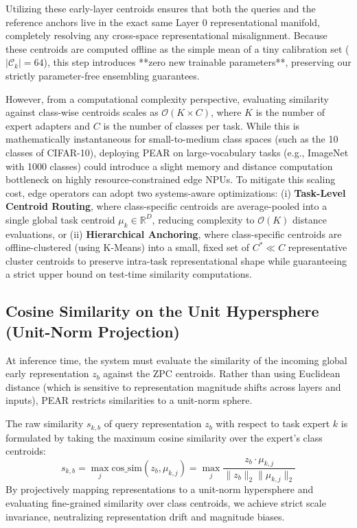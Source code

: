 Utilizing these early-layer centroids ensures that both the queries and the reference anchors live in the exact same Layer 0 representational manifold, completely resolving any cross-space representational misalignment. Because these centroids are computed offline as the simple mean of a tiny calibration set ($|\mathcal{C}_{k}| = 64$), this step introduces **zero new trainable parameters**, preserving our strictly parameter-free ensembling guarantees.

However, from a computational complexity perspective, evaluating similarity against class-wise centroids scales as $\mathcal{O}(K \times C)$, where $K$ is the number of expert adapters and $C$ is the number of classes per task. While this is mathematically instantaneous for small-to-medium class spaces (such as the 10 classes of CIFAR-10), deploying PEAR on large-vocabulary tasks (e.g., ImageNet with 1000 classes) could introduce a slight memory and distance computation bottleneck on highly resource-constrained edge NPUs. To mitigate this scaling cost, edge operators can adopt two systems-aware optimizations: (i) \textbf{Task-Level Centroid Routing}, where class-specific centroids are average-pooled into a single global task centroid $\mu_k \in \mathbb{R}^D$, reducing complexity to $\mathcal{O}(K)$ distance evaluations, or (ii) \textbf{Hierarchical Anchoring}, where class-specific centroids are offline-clustered (using K-Means) into a small, fixed set of $C^* \ll C$ representative cluster centroids to preserve intra-task representational shape while guaranteeing a strict upper bound on test-time similarity computations.

\subsection{Cosine Similarity on the Unit Hypersphere (Unit-Norm Projection)}
At inference time, the system must evaluate the similarity of the incoming global early representation $z_b$ against the ZPC centroids. Rather than using Euclidean distance (which is sensitive to representation magnitude shifts across layers and inputs), PEAR restricts similarities to a unit-norm sphere.

The raw similarity $s_{k, b}$ of query representation $z_b$ with respect to task expert $k$ is formulated by taking the maximum cosine similarity over the expert's class centroids:
\begin{equation}
    s_{k, b} = \max_{j} \text{cos\_sim}(z_b, \mu_{k, j}) = \max_{j} \frac{z_b \cdot \mu_{k, j}}{\|z_b\|_2 \|\mu_{k, j}\|_2}
\end{equation}
By projectively mapping representations to a unit-norm hypersphere and evaluating fine-grained similarity over class centroids, we achieve strict scale invariance, neutralizing representation drift and magnitude biases.

